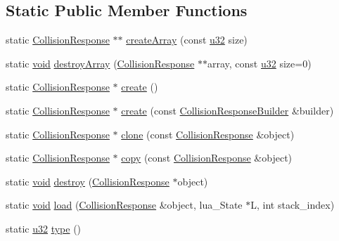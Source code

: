 \subsection*{Static Public Member Functions}
\begin{DoxyCompactItemize}
\item 
static \mbox{\hyperlink{classnjli_1_1_collision_response}{Collision\+Response}} $\ast$$\ast$ \mbox{\hyperlink{classnjli_1_1_collision_response_ad8ba8d9462d45a5b47b0aa35c1e300ee}{create\+Array}} (const \mbox{\hyperlink{_util_8h_a10e94b422ef0c20dcdec20d31a1f5049}{u32}} size)
\item 
static \mbox{\hyperlink{_thread_8h_af1e856da2e658414cb2456cb6f7ebc66}{void}} \mbox{\hyperlink{classnjli_1_1_collision_response_af5733e1bb53053a28251d425217204df}{destroy\+Array}} (\mbox{\hyperlink{classnjli_1_1_collision_response}{Collision\+Response}} $\ast$$\ast$array, const \mbox{\hyperlink{_util_8h_a10e94b422ef0c20dcdec20d31a1f5049}{u32}} size=0)
\item 
static \mbox{\hyperlink{classnjli_1_1_collision_response}{Collision\+Response}} $\ast$ \mbox{\hyperlink{classnjli_1_1_collision_response_a1835d7480df528671d398a9f6b5b0321}{create}} ()
\item 
static \mbox{\hyperlink{classnjli_1_1_collision_response}{Collision\+Response}} $\ast$ \mbox{\hyperlink{classnjli_1_1_collision_response_ad83913a6368ddb7e04d73e3fb505d8d5}{create}} (const \mbox{\hyperlink{classnjli_1_1_collision_response_builder}{Collision\+Response\+Builder}} \&builder)
\item 
static \mbox{\hyperlink{classnjli_1_1_collision_response}{Collision\+Response}} $\ast$ \mbox{\hyperlink{classnjli_1_1_collision_response_a920e06f942aa95ce2ec26e207ed852cd}{clone}} (const \mbox{\hyperlink{classnjli_1_1_collision_response}{Collision\+Response}} \&object)
\item 
static \mbox{\hyperlink{classnjli_1_1_collision_response}{Collision\+Response}} $\ast$ \mbox{\hyperlink{classnjli_1_1_collision_response_a86fa2b8ab53032b1d174cec2b95dbddf}{copy}} (const \mbox{\hyperlink{classnjli_1_1_collision_response}{Collision\+Response}} \&object)
\item 
static \mbox{\hyperlink{_thread_8h_af1e856da2e658414cb2456cb6f7ebc66}{void}} \mbox{\hyperlink{classnjli_1_1_collision_response_af3b0b079eb2acd51fbf4c98be372d0c6}{destroy}} (\mbox{\hyperlink{classnjli_1_1_collision_response}{Collision\+Response}} $\ast$object)
\item 
static \mbox{\hyperlink{_thread_8h_af1e856da2e658414cb2456cb6f7ebc66}{void}} \mbox{\hyperlink{classnjli_1_1_collision_response_a80964006cfa86613b5f15ec53139d26b}{load}} (\mbox{\hyperlink{classnjli_1_1_collision_response}{Collision\+Response}} \&object, lua\+\_\+\+State $\ast$L, int stack\+\_\+index)
\item 
static \mbox{\hyperlink{_util_8h_a10e94b422ef0c20dcdec20d31a1f5049}{u32}} \mbox{\hyperlink{classnjli_1_1_collision_response_a38cddefa3c200081852fa1613369857e}{type}} ()
\end{DoxyCompactItemize}
